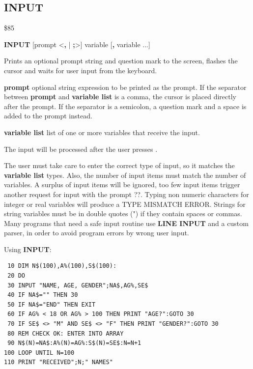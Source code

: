 \newpage
\subsection{INPUT}
\begin{description}[leftmargin=2cm,style=nextline]
\item [Token:] \$85
\item [Format:] {\bf INPUT} [prompt <{\bf,} | {\bf;}>]
		variable [{\bf,} variable ...]
\item [Usage:] Prints an optional
               prompt string and question mark to the screen,
               flashes the cursor and waits for user input
               from the keyboard.

               {\bf prompt} optional string expression to be printed
               as the prompt.
               If the separator between {\bf prompt} and {\bf variable list}
               is a comma, the cursor is placed directly after
               the prompt. If the separator is a semicolon,
               a question mark and a space is added to the prompt instead.

               {\bf variable list} list of one or more
               variables that receive the input.

               The input will be processed after the user presses .

\item [Remarks:] The user must take care to enter the correct
               type of input, so it matches the {\bf variable list} types.
               Also, the number of input items must match the number
               of variables. A surplus of input items will be ignored,
               too few input items trigger another request for input
               with the prompt ??.
               Typing non numeric characters for integer or real
               variables will produce a TYPE MISMATCH ERROR.
               Strings for string variables must be in double quotes (")
               if they contain spaces or commas.
               Many programs that need a safe input routine use
               {\bf LINE INPUT} and a custom parser, in order
               to avoid program errors by wrong user input.

\item [Example:] Using {\bf INPUT}:
\begin{tcolorbox}[colback=black,coltext=white]
\verbatimfont{\codefont}
\begin{verbatim}
 10 DIM N$(100),A%(100),S$(100):
 20 DO
 30 INPUT "NAME, AGE, GENDER";NA$,AG%,SE$
 40 IF NA$="" THEN 30
 50 IF NA$="END" THEN EXIT
 60 IF AG% < 18 OR AG% > 100 THEN PRINT "AGE?":GOTO 30
 70 IF SE$ <> "M" AND SE$ <> "F" THEN PRINT "GENDER?":GOTO 30
 80 REM CHECK OK: ENTER INTO ARRAY
 90 N$(N)=NA$:A%(N)=AG%:S$(N)=SE$:N=N+1
100 LOOP UNTIL N=100
110 PRINT "RECEIVED";N;" NAMES"
\end{verbatim}
\end{tcolorbox}
\end{description}


